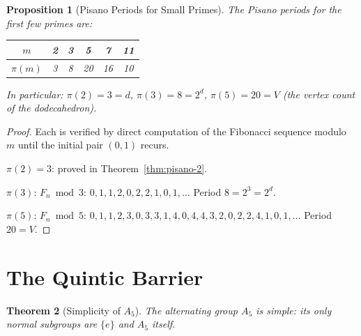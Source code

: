 \documentclass[11pt,a4paper]{article}
\theoremstyle{plain}
\newtheorem{theorem}{Theorem}[section]
\newtheorem{proposition}[theorem]{Proposition}
\theoremstyle{definition}
\begin{document}
\begin{proposition}[Pisano Periods for Small Primes]\label{prop:pisano-small}
The Pisano periods for the first few primes are:
\begin{center}
\begin{tabular}{c|ccccc}
$m$ & 2 & 3 & 5 & 7 & 11 \\
\hline
$\pi(m)$ & 3 & 8 & 20 & 16 & 10
\end{tabular}
\end{center}
In particular: $\pi(2) = 3 = d$, $\pi(3) = 8 = 2^{d}$,
$\pi(5) = 20 = V$ (the vertex count of the dodecahedron).
\end{proposition}

\begin{proof}
Each is verified by direct computation of the Fibonacci sequence
modulo $m$ until the initial pair $(0, 1)$ recurs.

$\pi(2) = 3$: proved in Theorem~\ref{thm:pisano-2}.

$\pi(3)$: $F_{n} \bmod 3$: $0, 1, 1, 2, 0, 2, 2, 1, 0, 1, \ldots$
Period $8 = 2^{3} = 2^{d}$.

$\pi(5)$: $F_{n} \bmod 5$:
$0, 1, 1, 2, 3, 0, 3, 3, 1, 4, 0, 4, 4, 3, 2, 0, 2, 2, 4, 1, 0, 1, \ldots$
Period $20 = V$.
\end{proof}

\section{The Quintic Barrier}\label{sec:quintic}

\begin{theorem}[Simplicity of $A_{5}$]\label{thm:a5-simple}
The alternating group $A_{5}$ is simple: its only normal subgroups are
$\{e\}$ and $A_{5}$ itself.
\end{theorem}
\end{document}
